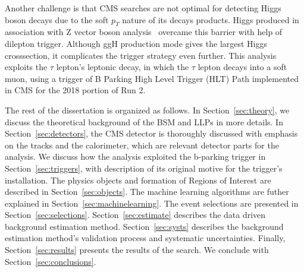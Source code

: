 Another challenge is that CMS searches are not optimal for detecting Higgs boson decays due to the soft $p_T$ nature of its decays products.
Higgs produced in association with Z vector boson analysis~\cite{ZHAN} overcame this barrier with help of dilepton trigger. 
Although ggH production mode gives the largest Higgs crosssection, it complicates the trigger strategy even further. 
This analysis exploits the $\tau$ lepton's leptonic decay, in which the $\tau$ lepton decays into a soft muon, using a trigger of B Parking High Level Trigger (HLT) Path implemented in CMS for the 2018 portion of Run 2.


The rest of the dissertation is organized as follows.
In Section~\ref{sec:theory}, we discuss the theoretical background of the BSM and LLPs in more details. 
In Section~\ref{sec:detectors}, the CMS detector is thoroughly discussed with emphasis on the tracks and the calorimeter, which are relevant detector parts for the analysis. 
We discuss how the analysis exploited the b-parking trigger in Section~\ref{sec:triggers}, with description of its original motive for the trigger's installation. 
The physics objects and formation of Regions of Interest are described in Section~\ref{sec:objects}.
The machine learning algorithms are futher explained in Section~\ref{sec:machinelearning}. 
The event selections are presented in Section~\ref{sec:selections}. 
Section~\ref{sec:estimate} describes the data driven background estimation method. 
Section~\ref{sec:systs} describes the background estimation method's validation process and systematic uncertainties.
Finally, Section~\ref{sec:results} presents the results of the search.
We conclude with Section~\ref{sec:conclusions}.

